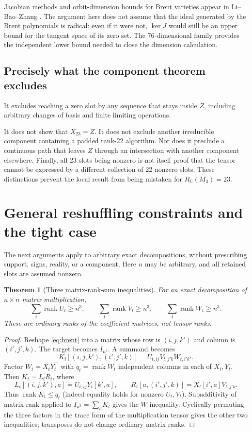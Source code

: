 \documentclass[11pt,letterpaper]{article}
\newtheorem{theorem}{Theorem}[section]
\theoremstyle{definition}\newtheorem{definition}[theorem]{Definition}
\theoremstyle{remark}\newtheorem{remark}[theorem]{Remark}
\newcommand{\CC}{\mathbb C}\newcommand{\ZZ}{\mathbb Z}\newcommand{\QQ}{\mathbb Q}
\DeclareMathOperator{\rank}{rank}\DeclareMathOperator{\tr}{tr}
\begin{document}
Jacobian methods and orbit-dimension bounds for Brent varieties appear in
Li--Bao--Zhang \cite{lbz}. The argument here does not assume that the ideal
generated by the Brent polynomials is radical: even if it were not,
$\ker J$ would still be an upper bound for the tangent space of its zero
set. The 76-dimensional family provides the independent lower bound
needed to close the dimension calculation.

\subsection{Precisely what the component theorem excludes}
It excludes reaching a zero slot by any sequence that stays inside $Z$,
including arbitrary changes of basis and finite limiting operations.

It does not show that $X_{23}=Z$. It does not exclude another irreducible
component containing a padded rank-22 algorithm. Nor does it preclude a
continuous path that leaves $Z$ through an intersection with another component
elsewhere. Finally, all 23 slots being nonzero is not itself proof that
the tensor cannot be expressed by a different collection of 22 nonzero
slots. These distinctions prevent the local result from being mistaken
for $R_{\CC}(M_3)=23$.

\section{General reshuffling constraints and the tight case}
\label{sec:reshuffle}
The next arguments apply to arbitrary exact decompositions, without
prescribing support, signs, reality, or a component. Here $n$ may be
arbitrary, and all retained slots are assumed nonzero.

\begin{theorem}[Three matrix-rank-sum inequalities]\label{thm:ranksum}
For an exact decomposition of $n\times n$ matrix multiplication,
\begin{equation}\label{eq:ranksum}
\sum_t\rank U_t\ge n^3,\qquad
\sum_t\rank V_t\ge n^3,\qquad
\sum_t\rank W_t\ge n^3.
\end{equation}
These are ordinary ranks of the coefficient matrices, not tensor ranks.
\end{theorem}
\begin{proof}
Reshape \eqref{eq:brent} into a matrix whose row is $(i,j,k')$ and column
is $(i',j',k)$. The target becomes $I_{n^3}$. A summand becomes
\[
 K_t[(i,j,k'),(i',j',k)]=U_{t,ij}V_{t,j'k}W_{t,i'k'}.
\]
Factor $W_t=X_tY_t^\top$ with $q_t=\rank W_t$ independent columns in each
of $X_t,Y_t$. Then $K_t=L_tR_t$, where
\[
 L_t[(i,j,k'),a]=U_{t,ij}Y_t[k',a],\qquad
 R_t[a,(i',j',k)]=X_t[i',a]V_{t,j'k}.
\]
Thus $\rank K_t\le q_t$ (indeed equality holds for nonzero $U_t,V_t$).
Subadditivity of matrix rank applied to $I_{n^3}=\sum_tK_t$ gives the
$W$ inequality. Cyclically permuting the three factors in the trace
form of the multiplication tensor gives the other two inequalities;
transposes do not change ordinary matrix ranks.
\end{proof}
\end{document}
